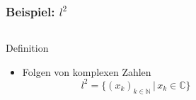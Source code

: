 %
%
%
\bgroup
\begin{frame}[t]
\setlength{\abovedisplayskip}{5pt}
\setlength{\belowdisplayskip}{5pt}
\frametitle{Beispiel: $l^2$}
\vspace{-20pt}
\begin{columns}[t,onlytextwidth]
\begin{column}{0.48\textwidth}
\begin{block}{Definition}
\begin{itemize}
\item Folgen von komplexen Zahlen
\[
l^2
=
\{(x_k)_{k\in\mathbb{N}}\,|\, x_k \in\mathbb{C}\}
\]
\end{itemize}
\end{block}
\end{column}
\begin{column}{0.48\textwidth}
\end{column}
\end{columns}
\end{frame}
\egroup

